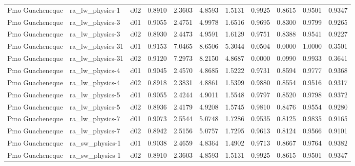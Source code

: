 \begin{longtable}{lllrrrrrrrr}
      Pmo Guacheneque  &       ra\_lw\_physics-1 &     d02 &   0.8910 &   2.3603 &   4.8593 &       1.5131 &        0.9925 &       0.8615 &           0.9501 &  0.9347 \\
      Pmo Guacheneque  &       ra\_lw\_physics-3 &     d01 &   0.9055 &   2.4751 &   4.9978 &       1.6516 &        0.9695 &       0.8300 &           0.9799 &  0.9265 \\
      Pmo Guacheneque  &       ra\_lw\_physics-3 &     d02 &   0.8930 &   2.4473 &   4.9591 &       1.6129 &        0.9751 &       0.8388 &           0.9541 &  0.9227 \\
      Pmo Guacheneque  &      ra\_lw\_physics-31 &     d01 &   0.9153 &   7.0465 &   8.6506 &       5.3044 &        0.0504 &       0.0000 &           1.0000 &  0.3501 \\
      Pmo Guacheneque  &      ra\_lw\_physics-31 &     d02 &   0.9120 &   7.2973 &   8.2150 &       4.8687 &        0.0000 &       0.0990 &           0.9933 &  0.3641 \\
      Pmo Guacheneque  &       ra\_lw\_physics-4 &     d01 &   0.9045 &   2.4570 &   4.8685 &       1.5222 &        0.9731 &       0.8594 &           0.9777 &  0.9368 \\
      Pmo Guacheneque  &       ra\_lw\_physics-4 &     d02 &   0.8918 &   2.3831 &   4.8861 &       1.5399 &        0.9880 &       0.8554 &           0.9516 &  0.9317 \\
      Pmo Guacheneque  &       ra\_lw\_physics-5 &     d01 &   0.9055 &   2.4244 &   4.9011 &       1.5548 &        0.9797 &       0.8520 &           0.9798 &  0.9372 \\
      Pmo Guacheneque  &       ra\_lw\_physics-5 &     d02 &   0.8936 &   2.4179 &   4.9208 &       1.5745 &        0.9810 &       0.8476 &           0.9554 &  0.9280 \\
      Pmo Guacheneque  &       ra\_lw\_physics-7 &     d01 &   0.9073 &   2.5544 &   5.0748 &       1.7286 &        0.9535 &       0.8125 &           0.9835 &  0.9165 \\
      Pmo Guacheneque  &       ra\_lw\_physics-7 &     d02 &   0.8942 &   2.5156 &   5.0757 &       1.7295 &        0.9613 &       0.8124 &           0.9566 &  0.9101 \\
      Pmo Guacheneque  &       ra\_sw\_physics-1 &     d01 &   0.9038 &   2.4659 &   4.8364 &       1.4902 &        0.9713 &       0.8667 &           0.9764 &  0.9382 \\
      Pmo Guacheneque  &       ra\_sw\_physics-1 &     d02 &   0.8910 &   2.3603 &   4.8593 &       1.5131 &        0.9925 &       0.8615 &           0.9501 &  0.9347 \\

\end{longtable}
